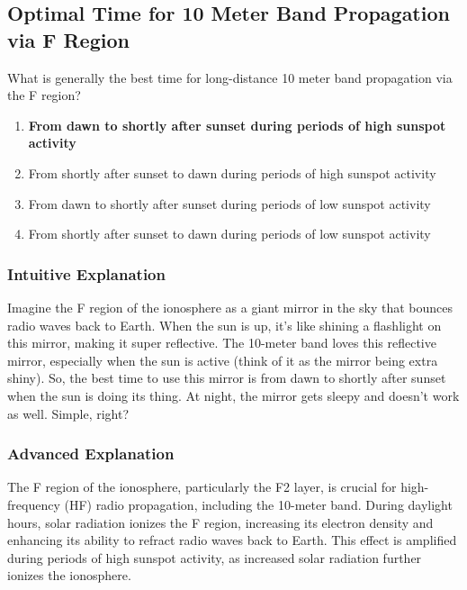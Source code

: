 \subsection{Optimal Time for 10 Meter Band Propagation via F Region}
\label{T3C09}

\begin{tcolorbox}[colback=gray!10!white,colframe=black!75!black,title=T3C09]
What is generally the best time for long-distance 10 meter band propagation via the F region?  
\begin{enumerate}[label=\Alph*)]
    \item \textbf{From dawn to shortly after sunset during periods of high sunspot activity}
    \item From shortly after sunset to dawn during periods of high sunspot activity
    \item From dawn to shortly after sunset during periods of low sunspot activity
    \item From shortly after sunset to dawn during periods of low sunspot activity
\end{enumerate}
\end{tcolorbox}

\subsubsection{Intuitive Explanation}
Imagine the F region of the ionosphere as a giant mirror in the sky that bounces radio waves back to Earth. When the sun is up, it’s like shining a flashlight on this mirror, making it super reflective. The 10-meter band loves this reflective mirror, especially when the sun is active (think of it as the mirror being extra shiny). So, the best time to use this mirror is from dawn to shortly after sunset when the sun is doing its thing. At night, the mirror gets sleepy and doesn’t work as well. Simple, right?

\subsubsection{Advanced Explanation}
The F region of the ionosphere, particularly the F2 layer, is crucial for high-frequency (HF) radio propagation, including the 10-meter band. During daylight hours, solar radiation ionizes the F region, increasing its electron density and enhancing its ability to refract radio waves back to Earth. This effect is amplified during periods of high sunspot activity, as increased solar radiation further ionizes the ionosphere. 

